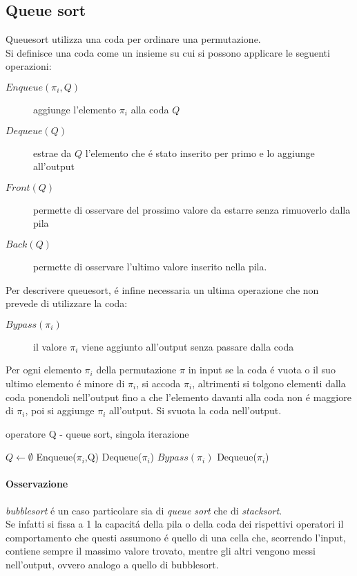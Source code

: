 \subsection*{Queue sort}
Queuesort utilizza una coda per ordinare una permutazione.\\
Si definisce una coda come un insieme su cui si possono applicare le seguenti operazioni:
\begin{description}
   \item[$Enqueue(\pi_i,Q)$] aggiunge l'elemento $\pi_i$ alla coda $Q$
   \item[$Dequeue(Q)$] estrae da $Q$ l'elemento che \'e stato inserito per primo e lo aggiunge all'output
   \item[$Front(Q)$] permette di osservare del prossimo valore da estarre senza rimuoverlo dalla pila
   \item[$Back(Q)$] permette di osservare l'ultimo valore inserito nella pila.
\end{description}
Per descrivere queuesort, \'e infine necessaria un ultima operazione che non prevede di utilizzare la coda:\begin{description}\item[$Bypass(\pi_i)$] il valore $\pi_i$ viene aggiunto all'output senza passare dalla coda\end{description}
Per ogni elemento $\pi_i$ della permutazione $\pi$ in input se la coda \'e vuota o il suo ultimo elemento \'e minore di $\pi_i$, si accoda $\pi_i$, altrimenti si tolgono elementi dalla coda ponendoli nell'output fino a che l'elemento davanti  alla coda non \'e maggiore di $\pi_i$, poi si aggiunge $\pi_i$ all'output. Si svuota la coda nell'output\cite{magnusson2013sorting}. 
\begin{algorithm}[H]
   \caption{operatore Q - queue sort, singola iterazione}
\begin{algorithmic}[1]
\State $Q\leftarrow\emptyset$
\State Enqueue($\pi_i$,Q)
\Else
{}
\State Dequeue($\pi_i$)
\EndWhile
\State $Bypass(\pi_i)$
\EndIf
\EndFor
{}
\State Dequeue($\pi_i$)
\EndWhile
\end{algorithmic}
\end{algorithm}
\paragraph*{Osservazione}\textit{bubblesort} \'e un caso particolare sia di \textit{queue sort} che di \textit{stacksort}.\\
Se infatti si fissa a 1 la capacit\'a della pila o della coda dei rispettivi operatori il comportamento che questi assumono \'e quello di una cella che, scorrendo l'input, contiene sempre il massimo valore trovato, mentre gli altri vengono messi nell'output, ovvero analogo a quello di bubblesort.

